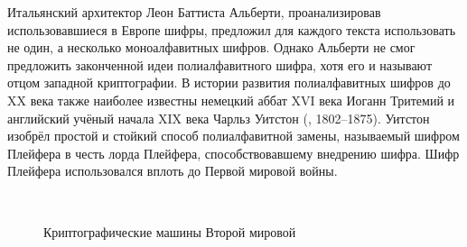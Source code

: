 Итальянский архитектор Леон Баттиста Альберти, проанализировав использовавшиеся в Европе шифры, предложил для каждого текста использовать не один, а несколько моноалфавитных шифров. Однако Альберти не смог предложить законченной идеи полиалфавитного шифра, хотя его и называют отцом западной криптографии. В истории развития полиалфавитных шифров до XX века также наиболее известны немецкий аббат XVI века Иоганн Тритемий и английский учёный начала XIX века Чарльз Уитстон (, 1802--1875). Уитстон изобрёл простой и стойкий способ полиалфавитной замены, называемый шифром Плейфера в честь лорда Плейфера, способствовавшему внедрению шифра. Шифр Плейфера использовался вплоть до Первой мировой войны.

\begin{figure}[t]
	\centering
	~~
	\caption{Криптографические машины Второй мировой}
\end{figure}

